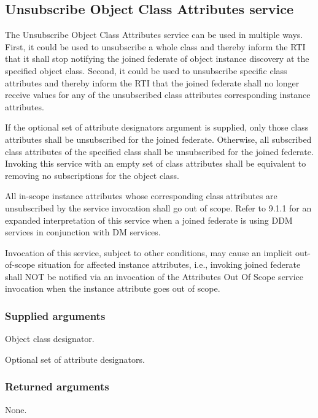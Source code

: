 \begin{compactstdpage}
    \subsection{Unsubscribe Object Class Attributes service}

    The Unsubscribe Object Class Attributes service can be used in multiple ways. First, it could be used to unsubscribe a whole class and thereby inform the RTI that it shall stop notifying the joined federate of object instance discovery at the specified object class. Second, it could be used to unsubscribe specific class attributes and thereby inform the RTI that the joined federate shall no longer receive values for any of the unsubscribed class attributes corresponding instance attributes.

    If the optional set of attribute designators argument is supplied, only those class attributes shall be unsubscribed for the joined federate. Otherwise, all subscribed class attributes of the specified class shall be unsubscribed for the joined federate. Invoking this service with an empty set of class attributes shall be equivalent to removing no subscriptions for the object class.

    All in-scope instance attributes whose corresponding class attributes are unsubscribed by the service invocation shall go out of scope. Refer to 9.1.1 for an expanded interpretation of this service when a joined federate is using DDM services in conjunction with DM services.

    Invocation of this service, subject to other conditions, may cause an implicit out-of-scope situation for affected instance attributes, i.e., invoking joined federate shall NOT be notified via an invocation of the Attributes Out Of Scope \rtiinitiated{} service invocation when the instance attribute goes out of scope.

    \subsubsection{Supplied arguments}
    \begin{stdalphalist}
        \item Object class designator.
        \item Optional set of attribute designators.
    \end{stdalphalist}

    \subsubsection{Returned arguments}
    \begin{stdalphalist}
        \item None.
    \end{stdalphalist}
\end{compactstdpage}

